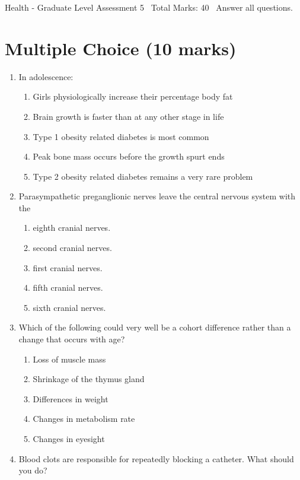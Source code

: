 \documentclass[12pt]{article}
\begin{document}
\begin{center}
Health - Graduate Level Assessment 5 \
Total Marks: 40 \
Answer all questions.
\end{center}

\section*{Multiple Choice (10 marks)}
\begin{enumerate}[label=\arabic*.]
\item In adolescence:
\begin{enumerate}[label=(\alph*)]
    \item Girls physiologically increase their percentage body fat
    \item Brain growth is faster than at any other stage in life
    \item Type 1 obesity related diabetes is most common
    \item Peak bone mass occurs before the growth spurt ends
    \item Type 2 obesity related diabetes remains a very rare problem
\end{enumerate}
\item Parasympathetic preganglionic nerves leave the central nervous system with the
\begin{enumerate}[label=(\alph*)]
    \item eighth cranial nerves.
    \item second cranial nerves.
    \item first cranial nerves.
    \item fifth cranial nerves.
    \item sixth cranial nerves.
\end{enumerate}
\item Which of the following could very well be a cohort difference rather than a change that
occurs with age?
\begin{enumerate}[label=(\alph*)]
    \item Loss of muscle mass
    \item Shrinkage of the thymus gland
    \item Differences in weight
    \item Changes in metabolism rate
    \item Changes in eyesight
\end{enumerate}
\item Blood clots are responsible for repeatedly blocking a catheter. What should you do?

\end{enumerate}
\end{document}
